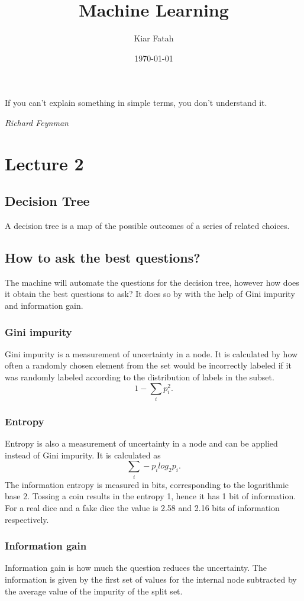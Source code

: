 \documentclass[12pt]{article}
\title{Machine Learning}
\author{Kiar Fatah}
\date{\today}
\numberwithin{equation}{section}
\begin{document}
\maketitle

\newpage

\tableofcontents 

\newpage
\epigraph{If you can’t explain something in simple terms, you don’t understand it.}{\textit{Richard Feynman }}
\newpage

\section{Lecture 2}
\subsection{Decision Tree}
A decision tree is a map of the possible outcomes of a series of related choices.
\subsection{How to ask the best questions?}
The machine will automate the questions for the decision tree, however how does it obtain the best questions to ask? It does so by with the help of Gini impurity and information gain.
\subsubsection{Gini impurity}
Gini impurity is a measurement of uncertainty in a node. It is calculated by how often a randomly chosen element from the set would be incorrectly labeled if it was randomly labeled according to the distribution of labels in the subset. 
\begin{equation}
    1 - \sum_i p_i^2.
\end{equation}
\subsubsection{Entropy}
Entropy is also a measurement of uncertainty in a node and can be applied instead of Gini impurity. It is calculated as
\begin{equation}
    \sum_i -p_ilog_2 p_i.
\end{equation}
The information entropy is measured in bits, corresponding to the logarithmic base 2. Tossing a coin results in the entropy 1, hence it has 1 bit of information. For a real dice and a fake dice the value is 2.58 and 2.16 bits of information respectively.
\subsubsection{Information gain}
Information gain is how much the question reduces the uncertainty. The information is given by the first set of values for the internal node subtracted by the average value of the impurity of the split set. 
\end{document}
